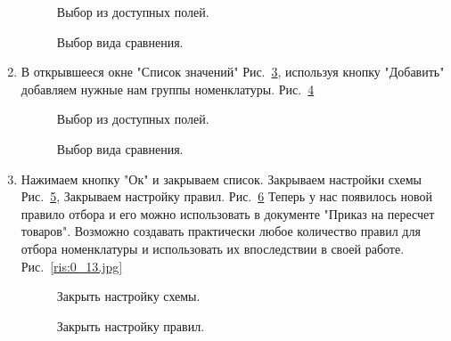 \begin{enumerate}
	\begin{figure}[H]
		\caption{Выбор из доступных полей.}
		\label{ris:0_7.jpg}
	\end{figure}
	\begin{figure}[H]
		\caption{Выбор вида сравнения.}
		\label{ris:0_8.jpg}
	\end{figure}
	\item В открывшееся окне "Список значений" Рис.~\ref{ris:0_9.jpg}, используя кнопку "Добавить" добавляем нужные нам группы номенклатуры. Рис.~\ref{ris:0_10.jpg}
	\begin{figure}[H]
		\caption{Выбор из доступных полей.}
		\label{ris:0_9.jpg}
	\end{figure}
	\begin{figure}[H]
		\caption{Выбор вида сравнения.}
		\label{ris:0_10.jpg}
	\end{figure}
		\item Нажимаем кнопку "Ок" и закрываем список. Закрываем настройки схемы Рис.~\ref{ris:0_11.jpg}, Закрываем настройку правил. Рис.~\ref{ris:0_12.jpg}
		Теперь у нас появилось новой правило отбора и его можно использовать в документе  "Приказ на пересчет товаров". Возможно создавать практически любое количество правил для отбора номенклатуры и использовать их  впоследствии в своей работе. Рис.~\ref{ris:0_13.jpg}
	\begin{figure}[H]
		\caption{Закрыть настройку схемы.}
		\label{ris:0_11.jpg}
	\end{figure}
	\begin{figure}[H]
		\caption{Закрыть настройку правил.}
		\label{ris:0_12.jpg}
	\end{figure}


\end{enumerate}
